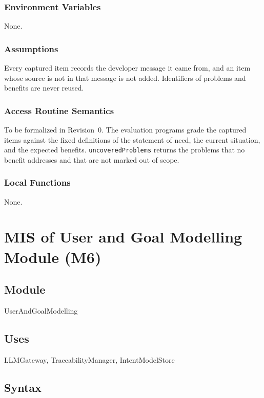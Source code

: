 \documentclass[12pt, titlepage]{article}
\begin{document}
\subsubsection{Environment Variables}

None.

\subsubsection{Assumptions}

Every captured item records the developer message it came from, and an item
whose source is not in that message is not added. Identifiers of problems and
benefits are never reused.

\subsubsection{Access Routine Semantics}

To be formalized in Revision~0. The evaluation programs grade the captured
items against the fixed definitions of the statement of need, the current
situation, and the expected benefits. \texttt{uncoveredProblems} returns the
problems that no benefit addresses and that are not marked out of scope.

\subsubsection{Local Functions}

None.

\newpage
\section{MIS of User and Goal Modelling Module (M6)} \label{MISUsers}

\subsection{Module}

UserAndGoalModelling

\subsection{Uses}

LLMGateway, TraceabilityManager, IntentModelStore

\subsection{Syntax}
\end{document}
